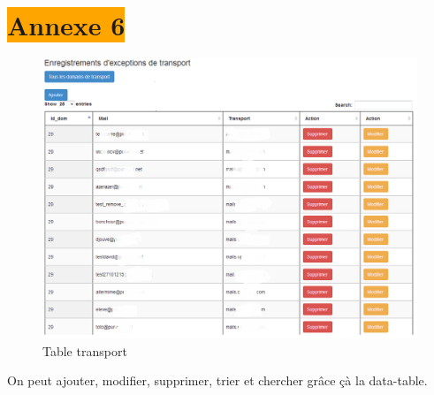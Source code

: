 \section{\colorbox{orange}{Annexe 6}}
\label{transport}
\begin{figure}[!h]
\begin{center}
\includegraphics[width=15cm]{image/table_transport.png}
\end{center}
\caption{Table transport}
\end{figure}
\begin{center}
On peut ajouter, modifier, supprimer, trier et chercher grâce çà la data-table.
\end{center}